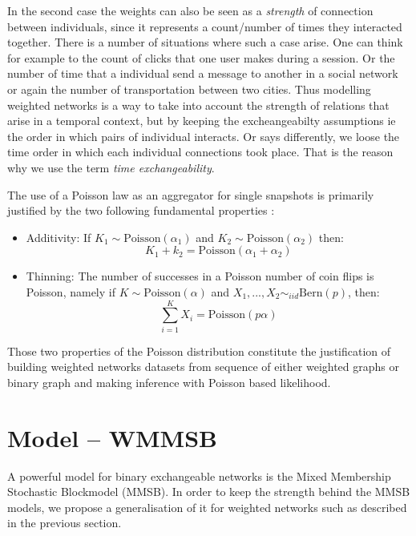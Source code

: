 In the second case the weights can also be seen as a \emph{strength} of connection between individuals, since it represents a count/number of times they interacted together. There is a number of situations where such a case arise. One can think for example to the count of clicks that one user makes during a session. Or the number of time that a individual send a message to another in a social network or again the number of transportation between two cities. Thus modelling weighted networks is a way to take into account the strength of relations that arise in a temporal context, but by keeping the excheangeabilty assumptions ie the order in which pairs of individual interacts. Or says differently, we loose the time order in which each individual connections took place. That is the reason why we use the term \emph{time exchangeability}.

The use of a Poisson law as an aggregator for single snapshots is primarily justified by the two following fundamental properties \cite{orbanz2012lecture}:
\begin{itemize}
\item{Additivity}: If $K_1 \sim \mathrm{Poisson}(\alpha_1)$ and $K_2 \sim \mathrm{Poisson}(\alpha_2)$ then:
    \begin{equation}
        K_1 + k_2 = \mathrm{Poisson}(\alpha_1 + \alpha_2)
    \end{equation}
\item {Thinning}: The number of successes in a Poisson number of coin flips is Poisson, namely if $K \sim \mathrm{Poisson}(\alpha)$ and $X_1,...,X_2 \sim_{iid} \mathrm{Bern}(p)$, then:
    \begin{equation}
        \sum_{i=1}^K X_i = \mathrm{Poisson}(p\alpha)
    \end{equation}
\end{itemize}

Those two properties of the Poisson distribution constitute the justification of building weighted networks datasets from sequence of either weighted graphs or binary graph and making inference with Poisson based likelihood. 

\section{Model -- WMMSB}
A powerful model for binary exchangeable networks is the Mixed Membership Stochastic Blockmodel (MMSB). In order to keep the strength behind the MMSB models, we propose a generalisation of it for weighted networks such as described in the previous section.

